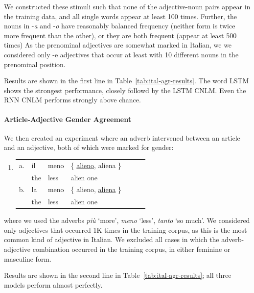 We constructed these stimuli such that none of the adjective-noun pairs appear in the training data, and all single words appear at least 100 times.
Further, the nouns in -\emph{a} and  -\emph{o} have reasonably balanced frequency (neither form is twice more frequent than the other), or they are both frequent (appear at least 500 times)
As the prenominal adjectives are somewhat marked in Italian, we  we considered only -e adjectives that occur at least with 10 different nouns in the prenominal position.

Results are shown in the first line in Table~\ref{tab:ital-agr-results}.
The word LSTM shows the strongest performance, closely followd by the LSTM CNLM.
Even the RNN CNLM performs strongly above chance.

\paragraph{Article-Adjective Gender Agreement}
We then created an experiment where an adverb intervened between an article and an adjective, both of which were marked for gender:
\begin{enumerate}[label={(\arabic*)}]
	\item 
		\begin{tabular}[t]{lllllll}
	a. & il & meno & \{ \underline{alieno}, aliena \} \\
   &  the & less & alien one  \\
	b. & la & meno & \{ alieno, \underline{aliena} \} \\
    &the & less & alien one \\
\end{tabular}
\end{enumerate}
where we used the adverbs \emph{pi{\`u}} `more', \emph{meno} `less', \emph{tanto} `so much'.
We considered only adjectives that occurred 1K times in the training corpus, as this is the most common kind of adjective in Italian.
We excluded all cases in which the adverb-adjective combination occurred in the training corpus, in either feminine or masculine form.



Results are shown in the second line in Table~\ref{tab:ital-agr-results}; all three models perform almost perfectly.

